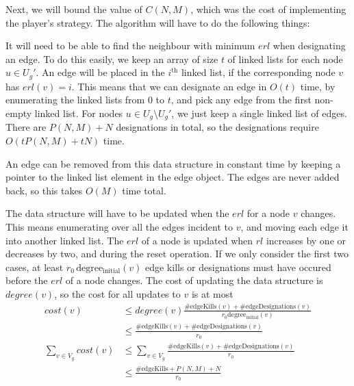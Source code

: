 Next, we will bound the value of $C(N, M)$, which was the cost of implementing the player's strategy.
The algorithm will have to do the following things:

It will need to be able to find the neighbour with minimum $erl$ when designating an edge.
To do this easily, we keep an array of size $t$ of linked lists for each node $u \in U_g'$. 
An edge will be placed in the $i^\mathrm{th}$ linked list, if the corresponding node $v$ has $erl(v)=i$.
This means that we can designate an edge in $O(t)$ time, by enumerating the linked lists from $0$ to $t$, and pick any edge from the first non-empty linked list.
For nodes $u \in U_g \setminus U_g'$, we just keep a single linked list of edges.
There are $P(N, M)+N$ designations in total, so the designations require $O(tP(N, M)+tN)$ time.

An edge can be removed from this data structure in constant time by keeping a pointer to the linked list element in the edge object.
The edges are never added back, so this takes $O(M)$ time total.

The data structure will have to be updated when the $erl$ for a node $v$ changes. 
This means enumerating over all the edges incident to $v$, and moving each edge it into another linked list.
The $erl$ of a node is updated when $rl$ increases by one or decreases by two, and during the reset operation.
If we only consider the first two cases, at least $r_0 \, \mathrm{degree_{initial}}(v)$ edge kills or designations must have occured before the $erl$ of a node changes.
The cost of updating the data structure is $degree(v)$, 
so the cost for all updates to $v$ is at most
\begin{align*}
cost(v) &\leq degree(v)\frac{\mathrm{\#edgeKills}(v) + \mathrm{\#edgeDesignations}(v)}{r_0 \mathrm{degree_{initial}}(v)}\\
 &\leq \frac{\mathrm{\#edgeKills}(v) + \mathrm{\#edgeDesignations}(v)}{r_0}\\
\sum\limits_{v\in V_g}{cost(v)} &\leq \sum\limits_{v\in V_g}{\frac{\mathrm{\#edgeKills}(v) + \mathrm{\#edgeDesignations}(v)}{r_0}}\\
 &\leq \frac{\mathrm{\#edgeKills} + P(N, M) + N}{r_0}
\end{align*}

